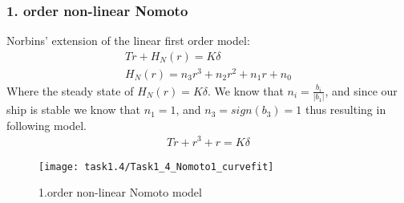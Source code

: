 \newpage
\subsubsection*{1. order non-linear Nomoto}
Norbins' extension of the linear first order model:
\begin{equation}
\begin{split}
	T\dot{r}+H_N(r)=K\delta \\
	H_N(r) = n_3r^3 + n_2r^2 + n_1r + n_0
\end{split}
\end{equation}
Where the steady state of $H_N(r)=K\delta$. We know that $n_i = \frac{b_i}{|b_1|}$, and since our ship is stable we know that $n_1=1$, and $n_3 = sign(b_3)=1$ thus resulting in following model.
\begin{equation}
\begin{split}
	T\dot{r}+r^3 + r=K\delta 
\end{split}
\end{equation}

\begin{figure}[h]
    \centering
    \texttt{[image: task1.4/Task1\_4\_Nomoto1\_curvefit]}
    \caption{1.order non-linear Nomoto model}
    \label{fig:nomoto1_nonlin}
\end{figure}
